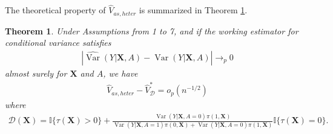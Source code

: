 \documentclass[11pt]{article}
\theoremstyle{referenceplain}
\newtheorem{theorem}{Theorem}
\theoremstyle{referencedefinition}
\theoremstyle{referenceremark}
\begin{document}
The theoretical property of $\widehat{V}_{as,heter}$ is summarized in Theorem \ref{thm: single-opt-est-heter}.
\begin{theorem}\label{thm: single-opt-est-heter}
    Under Assumptions from 1 to 7, and if the working estimator for conditional variance satisfies
    \begin{align}\label{var-const}
        \left|\widehat{\operatorname{Var}}(Y|\mathbf{X},A) - \operatorname{Var}(Y|\mathbf{X},A)\right|\to_p0
    \end{align}
   almost surely for $\mathbf{X}$ and $A$, we have
    \begin{align}
        \widehat{V}_{as,heter} - \widehat{V}_{\mathcal{D}}^*=o_p(n^{-1/2})
    \end{align}
    where 
    \begin{align}
    \mathcal{D}(\mathbf{X})=\mathbb{I}\{\tau(\mathbf{X})>0\}+\frac{\operatorname{Var}(Y|\mathbf{X},A=0)\pi(1,\mathbf{X})}{\operatorname{Var}(Y|\mathbf{X},A=1)\pi(0,\mathbf{X})+\operatorname{Var}(Y|\mathbf{X},A=0)\pi(1,\mathbf{X})}\mathbb{I}\{\tau(\mathbf{X})=0\}.
\end{align}
\end{theorem}
\end{document}
